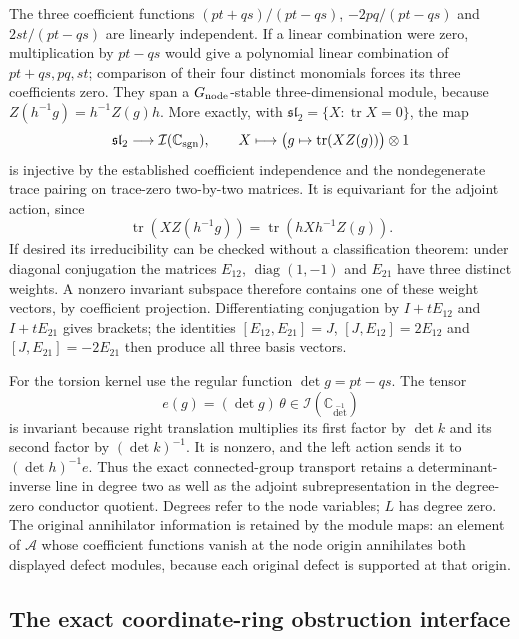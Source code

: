 The three coefficient functions $(pt+qs)/(pt-qs)$,
$-2pq/(pt-qs)$ and $2st/(pt-qs)$ are linearly independent. If a
linear combination were zero, multiplication by $pt-qs$ would give
a polynomial linear combination of $pt+qs,pq,st$; comparison of
their four distinct monomials forces its three coefficients zero.
They span a $G_{\rm node}$-stable three-dimensional module, because
$Z(h^{-1}g)=h^{-1}Z(g)h$. More exactly, with
$\mathfrak{sl}_2=\{X:\operatorname{tr}X=0\}$, the map
\[
 \mathfrak{sl}_2\longrightarrow\mathcal I(\mathbb C_{\rm sgn}),
 \qquad X\longmapsto\bigl(g\mapsto\operatorname{tr}(XZ(g))\bigr)
                 \otimes1
\]
is injective by the established coefficient independence and the
nondegenerate trace pairing on trace-zero two-by-two matrices.
It is equivariant for the adjoint action, since
\[
 \operatorname{tr}(X Z(h^{-1}g))
 =\operatorname{tr}(hXh^{-1}Z(g)).
\]
If desired its irreducibility can be checked without a classification
theorem: under diagonal conjugation the matrices $E_{12}$,
$\operatorname{diag}(1,-1)$ and $E_{21}$ have three distinct weights.
A nonzero invariant subspace therefore contains one of these weight
vectors, by coefficient projection. Differentiating conjugation by
$I+tE_{12}$ and $I+tE_{21}$ gives brackets; the identities
$[E_{12},E_{21}]=J$, $[J,E_{12}]=2E_{12}$ and
$[J,E_{21}]=-2E_{21}$ then produce all three basis vectors.

For the torsion kernel use the regular function $\det g=pt-qs$.
The tensor
\begin{equation}\label{eq:invariant-induced-torsion}
 e(g)=(\det g)\,\theta
 \in\mathcal I(\mathbb C_{\det^{-1}})
\end{equation}
is invariant because right translation multiplies its first factor
by $\det k$ and its second factor by $(\det k)^{-1}$.
It is nonzero, and the left action sends it to
$(\det h)^{-1}e$. Thus the exact connected-group transport retains
a determinant-inverse line in degree two as well as the adjoint
subrepresentation in the degree-zero conductor quotient. Degrees
refer to the node variables; $L$ has degree zero. The original
annihilator information is retained by the module maps: an element
of $\mathcal A$ whose coefficient functions vanish at the node origin
annihilates both displayed defect modules, because each original
defect is supported at that origin.

\subsection{The exact coordinate-ring obstruction interface}

